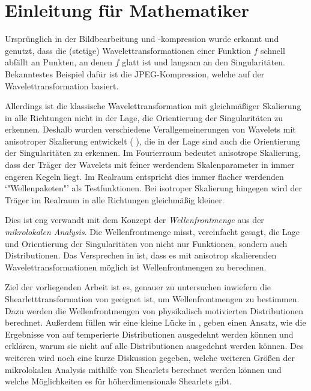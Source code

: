 \section{Einleitung für Mathematiker} %
\label{sec:einleitung_mathematik}

Ursprünglich in der Bildbearbeitung und -kompression wurde erkannt und genutzt, dass die (stetige) Wavelettransformationen einer Funktion $f$ schnell abfällt an Punkten, an denen $f$ glatt ist und langsam an den Singularitäten. Bekanntestes Beispiel dafür ist die JPEG-Kompression, welche auf der Wavelettransformation basiert.

Allerdings ist die klassische Wavelettransformation mit gleichmäßiger Skalierung in alle Richtungen nicht in der Lage, die Orientierung der Singularitäten zu erkennen. Deshalb wurden verschiedene Verallgemeinerungen von Wavelets mit anisotroper Skalierung entwickelt (\cite{Guo2006} \cite{Kutyniok2008} \cite{Candes2005}), die in der Lage sind auch die Orientierung der Singularitäten zu erkennen. Im Fourierraum bedeutet anisotrope Skalierung, dass der Träger der Wavelets mit feiner werdendem Skalenparameter in immer engeren Kegeln liegt. Im Realraum entspricht dies immer flacher werdenden `"Wellenpaketen"' als Testfunktionen. Bei isotroper Skalierung hingegen wird der Träger im Realraum in alle Richtungen gleichmäßig kleiner.

Dies ist eng verwandt mit dem Konzept der \emph{Wellenfrontmenge} aus der \emph{mikrolokalen Analysis}. Die Wellenfrontmenge misst, vereinfacht gesagt, die Lage und Orientierung der Singularitäten von nicht nur Funktionen, sondern auch Distributionen. Das Versprechen in \cite{Kutyniok2008} ist, dass es mit anisotrop skalierenden Wavelettransformationen möglich ist Wellenfrontmengen zu berechnen.

Ziel der vorliegenden Arbeit ist es, genauer zu untersuchen inwiefern die Shearletttransformation von \textcite{Kutyniok2008} geeignet ist, um Wellenfrontmengen zu bestimmen. Dazu werden die Wellenfrontmengen von physikalisch motivierten Distributionen berechnet. Außerdem füllen wir eine kleine Lücke in \cite{Kutyniok2008}, geben einen Ansatz, wie die Ergebnisse von \textcite{Kutyniok2008} auf temperierte Distributionen ausgedehnt werden können und erklären, warum sie nicht auf alle Distributionen ausgedehnt werden können.
Des weiteren wird noch eine kurze Diskussion gegeben, welche weiteren Größen der mikrolokalen Analysis mithilfe von Shearlets berechnet werden können und welche Möglichkeiten es für höherdimensionale Shearlets gibt.


